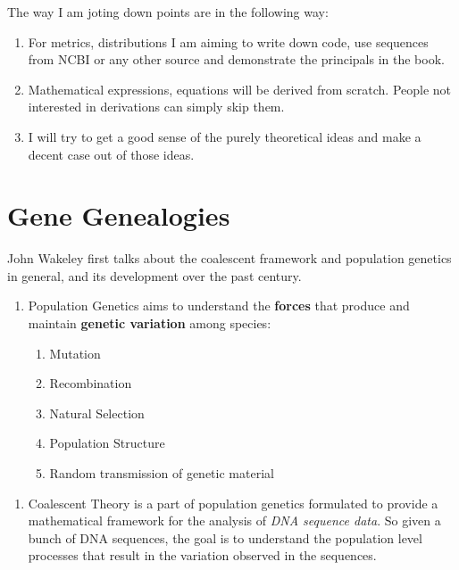 \documentclass[
]{book}
\providecommand{\tightlist}{%
  \setlength{\itemsep}{0pt}\setlength{\parskip}{0pt}}
\theoremstyle{definition}
\theoremstyle{definition}
\theoremstyle{definition}
\theoremstyle{definition}
\theoremstyle{remark}
\begin{document}
The way I am joting down points are in the following way:

\begin{enumerate}
\def\labelenumi{\arabic{enumi}.}
\item
  For metrics, distributions I am aiming to write down code, use sequences from NCBI or any other source and demonstrate the principals in the book.
\item
  Mathematical expressions, equations will be derived from scratch. People not interested in derivations can simply skip them.
\item
  I will try to get a good sense of the purely theoretical ideas and make a decent case out of those ideas.
\end{enumerate}

\hypertarget{gene-genealogies}{%
\chapter{Gene Genealogies}\label{gene-genealogies}}

John Wakeley first talks about the coalescent framework and population genetics in general, and its development over the past century.

\begin{enumerate}
\def\labelenumi{\arabic{enumi}.}
\tightlist
\item
  Population Genetics aims to understand the \textbf{forces} that produce and maintain \textbf{genetic variation} among species:

  \begin{enumerate}
  \def\labelenumii{\alph{enumii}.}
  \tightlist
  \item
    Mutation
  \item
    Recombination
  \item
    Natural Selection
  \item
    Population Structure
  \item
    Random transmission of genetic material
  \end{enumerate}
\end{enumerate}

\begin{enumerate}
\def\labelenumi{\arabic{enumi}.}
\setcounter{enumi}{1}
\tightlist
\item
  Coalescent Theory is a part of population genetics formulated to provide a mathematical framework for the analysis of \emph{DNA sequence data}. So given a bunch of DNA sequences, the goal is to understand the population level processes that result in the variation observed in the sequences.
\end{enumerate}
\end{document}
